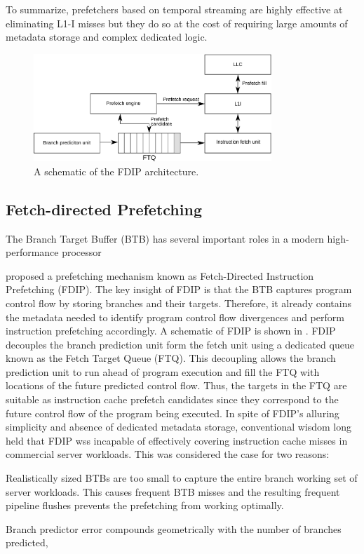 \documentclass[../main.tex]{subfiles}
\begin{document}
\begin{refsection}
To summarize, prefetchers based on temporal streaming are highly
effective at eliminating L1-I misses but they do so at the cost of
requiring large amounts of metadata storage and complex dedicated
logic.

\begin{figure}[ht]
  \centering
  \includegraphics[width=0.8\textwidth]{figures/fdip1.pdf}
  \caption{\label{fig:fdip} A schematic of the FDIP architecture.}
\end{figure}

\subsection{Fetch-directed Prefetching}
The Branch Target Buffer (BTB) has several important roles in a modern high-performance processor 

\textcite{reinman99_fetch_direc_instr_prefet} proposed a prefetching
mechanism known as Fetch-Directed Instruction Prefetching (FDIP). The
key insight of FDIP is that the BTB captures program control flow by
storing branches and their targets. Therefore, it already contains the
metadata needed to identify program control flow divergences and
perform instruction prefetching accordingly. A schematic of FDIP is
shown in . FDIP decouples the branch prediction unit
form the fetch unit using a dedicated queue known as the Fetch Target
Queue (FTQ). This decoupling allows the branch prediction unit to run
ahead of program execution and fill the FTQ with locations of the
future predicted control flow. Thus, the targets in the FTQ are
suitable as instruction cache prefetch candidates since they
correspond to the future control flow of the program being
executed. In spite of FDIP's alluring simplicity and absence of
dedicated metadata storage, conventional wisdom long held that FDIP
wss incapable of effectively covering instruction cache misses in
commercial server workloads. This was considered the case for two
reasons: \begin{inparaenum}[1)] \item Realistically sized BTBs are too
  small to capture the entire branch working set of server
  workloads. This causes frequent BTB misses and the resulting
  frequent pipeline flushes prevents the prefetching from working
  optimally. \item Branch predictor error compounds geometrically with
  the number of branches predicted, 
\end{inparaenum}



\end{refsection}
\end{document}
